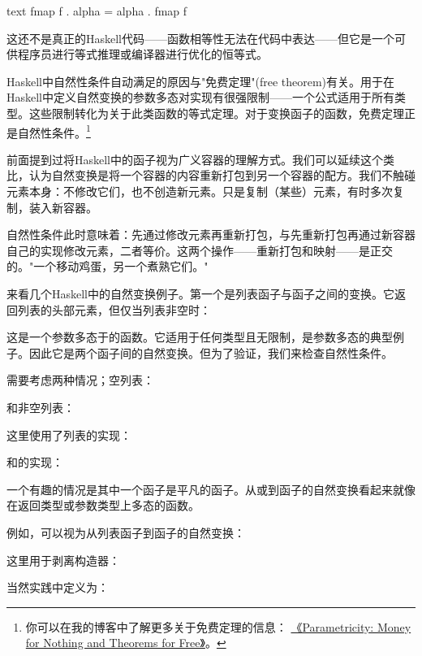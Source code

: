 \begin{snip}{text}
fmap f . alpha = alpha . fmap f
\end{snip}
这还不是真正的Haskell代码——函数相等性无法在代码中表达——但它是一个可供程序员进行等式推理或编译器进行优化的恒等式。

Haskell中自然性条件自动满足的原因与"免费定理"(free theorem)有关。用于在Haskell中定义自然变换的参数多态对实现有很强限制——一个公式适用于所有类型。这些限制转化为关于此类函数的等式定理。对于变换函子的函数，免费定理正是自然性条件。\footnote{
  你可以在我的博客中了解更多关于免费定理的信息：
  \href{https://bartoszmilewski.com/2014/09/22/parametricity-money-for-nothing-and-theorems-for-free/}{《Parametricity: Money for Nothing and Theorems for Free》}。}

前面提到过将Haskell中的函子视为广义容器的理解方式。我们可以延续这个类比，认为自然变换是将一个容器的内容重新打包到另一个容器的配方。我们不触碰元素本身：不修改它们，也不创造新元素。只是复制（某些）元素，有时多次复制，装入新容器。

自然性条件此时意味着：先通过修改元素再重新打包，与先重新打包再通过新容器自己的实现修改元素，二者等价。这两个操作——重新打包和映射——是正交的。"一个移动鸡蛋，另一个煮熟它们。"

来看几个Haskell中的自然变换例子。第一个是列表函子与函子之间的变换。它返回列表的头部元素，但仅当列表非空时：

这是一个参数多态于的函数。它适用于任何类型且无限制，是参数多态的典型例子。因此它是两个函子间的自然变换。但为了验证，我们来检查自然性条件。

需要考虑两种情况；空列表：


和非空列表：


这里使用了列表的实现：

和的实现：

一个有趣的情况是其中一个函子是平凡的函子。从或到函子的自然变换看起来就像在返回类型或参数类型上多态的函数。

例如，可以视为从列表函子到函子的自然变换：

这里用于剥离构造器：

当然实践中定义为：

